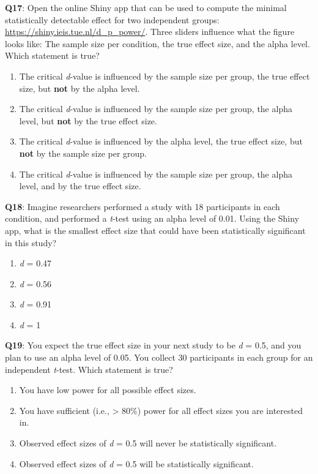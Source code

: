 \documentclass[
  oneside]{krantz}
\providecommand{\tightlist}{%
  \setlength{\itemsep}{0pt}\setlength{\parskip}{0pt}}
\begin{document}
\textbf{Q17}: Open the online Shiny app that can be used to compute the minimal statistically detectable effect for two independent groups: \url{https://shiny.ieis.tue.nl/d_p_power/}. Three sliders influence what the figure looks like: The sample size per condition, the true effect size, and the alpha level. Which statement is true?

\begin{enumerate}
\def\labelenumi{\Alph{enumi})}
\tightlist
\item
  The critical \emph{d}-value is influenced by the sample size per group, the true effect size, but \textbf{not} by the alpha level.
\item
  The critical \emph{d}-value is influenced by the sample size per group, the alpha level, but \textbf{not} by the true effect size.
\item
  The critical \emph{d}-value is influenced by the alpha level, the true effect size, but \textbf{not} by the sample size per group.
\item
  The critical \emph{d}-value is influenced by the sample size per group, the alpha level, and by the true effect size.
\end{enumerate}

\textbf{Q18}: Imagine researchers performed a study with 18 participants in each condition, and performed a \emph{t}-test using an alpha level of 0.01. Using the Shiny app, what is the smallest effect size that could have been statistically significant in this study?

\begin{enumerate}
\def\labelenumi{\Alph{enumi})}
\tightlist
\item
  \emph{d} = 0.47
\item
  \emph{d} = 0.56
\item
  \emph{d} = 0.91
\item
  \emph{d} = 1
\end{enumerate}

\textbf{Q19}: You expect the true effect size in your next study to be \emph{d} = 0.5, and you plan to use an alpha level of 0.05. You collect 30 participants in each group for an independent \emph{t}-test. Which statement is true?

\begin{enumerate}
\def\labelenumi{\Alph{enumi})}
\tightlist
\item
  You have low power for all possible effect sizes.
\item
  You have sufficient (i.e., \textgreater{} 80\%) power for all effect sizes you are interested in.
\item
  Observed effect sizes of \emph{d} = 0.5 will never be statistically significant.
\item
  Observed effect sizes of \emph{d} = 0.5 will be statistically significant.
\end{enumerate}
\end{document}

